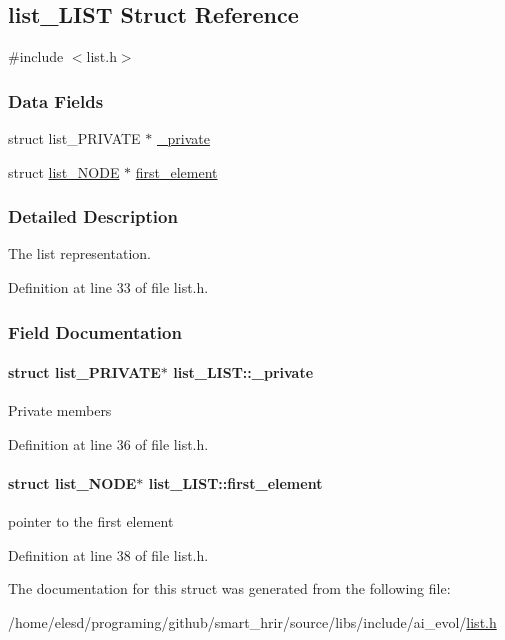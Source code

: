 \hypertarget{a00004}{\subsection{list\-\_\-\-L\-I\-S\-T Struct Reference}
\label{a00004}
}


{\ttfamily \#include $<$list.\-h$>$}

\subsubsection*{Data Fields}
\begin{DoxyCompactItemize}
\item 
struct list\-\_\-\-P\-R\-I\-V\-A\-T\-E $\ast$ \hyperlink{a00004_a20752f4888859e0baf612ed6e3c2e130}{\-\_\-private}
\item 
struct \hyperlink{a00005}{list\-\_\-\-N\-O\-D\-E} $\ast$ \hyperlink{a00004_aa33724826fc0a1c8b8b27b090156a1e1}{first\-\_\-element}
\end{DoxyCompactItemize}


\subsubsection{Detailed Description}
The list representation. 

Definition at line 33 of file list.\-h.



\subsubsection{Field Documentation}
\hypertarget{a00004_a20752f4888859e0baf612ed6e3c2e130}{
\paragraph[{\-\_\-private}]{\setlength{\rightskip}{0pt plus 5cm}struct list\-\_\-\-P\-R\-I\-V\-A\-T\-E$\ast$ list\-\_\-\-L\-I\-S\-T\-::\-\_\-private}}\label{a00004_a20752f4888859e0baf612ed6e3c2e130}
Private members 

Definition at line 36 of file list.\-h.

\hypertarget{a00004_aa33724826fc0a1c8b8b27b090156a1e1}{
\paragraph[{first\-\_\-element}]{\setlength{\rightskip}{0pt plus 5cm}struct {\bf list\-\_\-\-N\-O\-D\-E}$\ast$ list\-\_\-\-L\-I\-S\-T\-::first\-\_\-element}}\label{a00004_aa33724826fc0a1c8b8b27b090156a1e1}
pointer to the first element 

Definition at line 38 of file list.\-h.



The documentation for this struct was generated from the following file\-:\begin{DoxyCompactItemize}
\item 
/home/elesd/programing/github/smart\-\_\-hrir/source/libs/include/ai\-\_\-evol/\hyperlink{a00010}{list.\-h}\end{DoxyCompactItemize}
